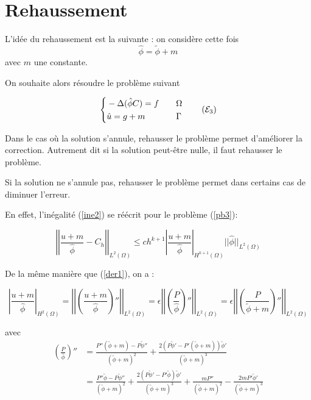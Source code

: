 \documentclass[french]{article}
\begin{document}
	\section*{Rehaussement}
	
	L'idée du rehaussement est la suivante : on considère cette fois
	$$\hat{\phi}=\tilde{\phi}+m$$
	avec $m$ une constante.
	
	On souhaite alors résoudre le problème suivant
	
	\begin{equation}
		\left\{\begin{aligned}
			&-\Delta (\hat{\phi}C)=f \quad &&\Omega \\
			&\hat{u}=g+m \quad &&\Gamma
		\end{aligned}\right. \label{pb3} \tag{$\mathcal{E}_3$}
	\end{equation}

	Dans le cas où la solution s'annule, rehausser le problème permet d'améliorer la correction. Autrement dit si la solution peut-être nulle, il faut rehausser le problème.
	
	Si la solution ne s'annule pas, rehausser le problème permet dans certains cas de diminuer l'erreur.
	
	En effet, l'inégalité (\ref{ine2}) se réécrit pour le problème (\ref{pb3}):
	
	\begin{equation}
		\left|\left|\frac{u+m}{\hat{\phi}}-C_h\right|\right|_{L^2(\Omega)}\le ch^{k+1}\left|\frac{u+m}{\hat{\phi}}\right|_{H^{k+1}(\Omega)}||\hat{\phi}||_{L^2(\Omega)} \label{ine3}
	\end{equation}
	
	De la même manière que (\ref{der1}), on a :
	
	\begin{equation}
		\left|\frac{u+m}{\hat{\phi}}\right|_{H^2(\Omega)}=\left|\left|\left(\frac{u+m}{\hat{\phi}}\right)''\right|\right|_{L^2(\Omega)}=\epsilon\left|\left|\left(\frac{P}{\hat{\phi}}\right)''\right|\right|_{L^2(\Omega)}=\epsilon\left|\left|\left(\frac{P}{\tilde{\phi}+m}\right)''\right|\right|_{L^2(\Omega)} \label{der2}
	\end{equation}
	
	avec
	\begin{align*}
		\left(\frac{P}{\hat{\phi}}\right)''&=\frac{P''(\tilde{\phi}+m)-P\tilde{\phi}''}{(\tilde{\phi}+m)^2}+\frac{2(P\tilde{\phi}'-P'(\tilde{\phi}+m))\tilde{\phi}'}{(\tilde{\phi}+m)^3} \\
		&=\frac{P''\tilde{\phi}-P\tilde{\phi}''}{(\tilde{\phi}+m)^2}+\frac{2(P\tilde{\phi}'-P'\tilde{\phi})\tilde{\phi}'}{(\tilde{\phi}+m)^3}+    \frac{mP''}{(\tilde{\phi}+m)^2}-\frac{2mP'\tilde{\phi}'}{(\tilde{\phi}+m)^3}
	\end{align*}
\end{document}
